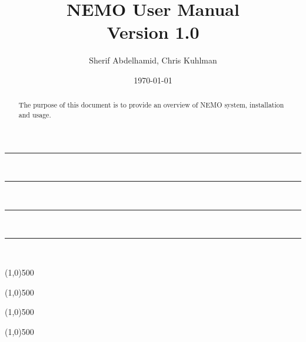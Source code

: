 \documentclass{article}%
\newcommand{\HRule}{\rule{\linewidth}{0.5mm}}
\begin{document}
\title{NEMO User Manual\\
Version 1.0}
\author{Sherif Abdelhamid, Chris Kuhlman}

\date{\today}
\maketitle


\tiny

\HRule \\[0.05cm]

\HRule \\[0.05cm]

\small

\tableofcontents

\tiny

\HRule \\[0.05cm]

\HRule \\[0.05cm]

\normalsize


\begin{abstract}

The purpose of this document is to provide an overview of NEMO system, installation and usage.

\end{abstract}




\line(1,0){500}



\line(1,0){500}



\line(1,0){500}


\line(1,0){500}





%
%

%
%
\end{document}

